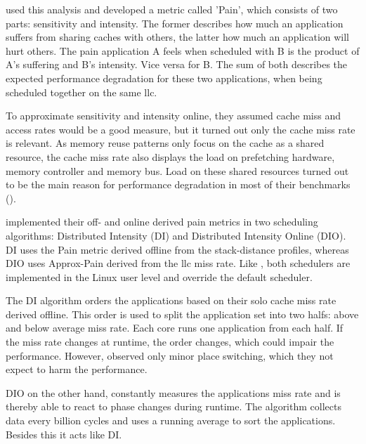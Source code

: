 \citeauthor{zhuravlev_addressing_2010} used this analysis and developed a
metric called 'Pain', which consists of two parts: sensitivity and intensity.
The former describes how much an application suffers from sharing caches with
others, the latter how much an application will hurt others.
The pain application A feels when scheduled with B is the product of A's
suffering and B's intensity.
Vice versa for B.
The sum of both describes the expected performance degradation for these two
applications, when being scheduled together on the same \gls{llc}.

To approximate sensitivity and intensity online, they assumed cache miss and
access rates would be a good measure, but it turned out only the cache miss
rate is relevant.
As memory reuse patterns only focus on the cache as a shared resource, the
cache miss rate also displays the load on prefetching hardware, memory
controller and memory bus.
Load on these shared resources turned out to be the main reason for performance
degradation in most of their benchmarks (\cite{zhuravlev_addressing_2010}).

\citeauthor{zhuravlev_addressing_2010} implemented their off- and online
derived pain metrics in two scheduling algorithms: Distributed Intensity (DI)
and Distributed Intensity Online (DIO).
DI uses the Pain metric derived offline from the stack-distance profiles,
whereas DIO uses Approx-Pain derived from the \gls{llc} miss rate.
Like \cite{banikazemi_pam_2008}, both schedulers are implemented in the
Linux user level and override the default scheduler.

The DI algorithm orders the applications based on their solo cache miss rate derived
offline.
This order is used to split the application set into two halfs: above and below
average miss rate.
Each core runs one application from each half.
If the miss rate changes at runtime, the order changes, which could impair
the performance.
However, \citeauthor{zhuravlev_addressing_2010} observed only minor place
switching, which they not expect to harm the performance.

DIO on the other hand, constantly measures the applications miss rate and is
thereby able to react to phase changes during runtime.
The algorithm collects data every billion cycles and uses a running average to
sort the applications.
Besides this it acts like DI.

